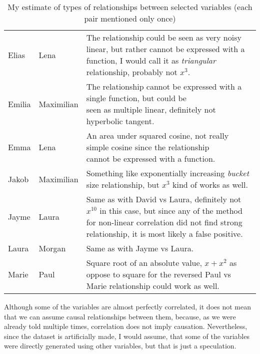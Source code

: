 \documentclass[a4paper,10pt]{article}\setlength{\textheight}{10in}\setlength{\textwidth}{6.5in}\setlength{\topmargin}{-0.125in}\setlength{\oddsidemargin}{-.2in}\setlength{\evensidemargin}{-.2in}\setlength{\headsep}{0.2in}\setlength{\footskip}{0pt}\usepackage{amsmath}\usepackage{fancyhdr}\usepackage{enumitem}\usepackage{hyperref}\usepackage{xcolor}\usepackage{graphicx}\pagestyle{fancy}
\begin{document}
\begin{enumerate}[topsep=0mm, partopsep=0mm, leftmargin=*]
\begin{table}[ht!]
\begin{tabular}{|l|l|l|}
     Elias &  Lena & \makecell{The relationship could be seen as very noisy linear, but rather cannot be\\expressed with a function, I would call it as \textit{triangular} relationship,\\probably not $x^3$.} \\[0.25cm]
     Emilia & Maximilian & \makecell{The relationship cannot be expressed with a single function, but could be\\seen as multiple linear, definitely not hyperbolic tangent.}\\[0.25cm]
     Emma &       Lena & \makecell{An area under squared cosine, not really simple cosine since the relationship\\cannot be expressed with a function.} \\[0.25cm]
     Jakob & Maximilian & \makecell{Something like exponentially increasing \textit{bucket} size relationship, but $x^3$ kind\\of works as well.} \\[0.25cm]
     Jayme &      Laura & \makecell{Same as with David vs Laura, definitely not $x^{10}$ in this case, but since any\\of the method for non-linear correlation did not find strong relationship, it\\is most likely a false positive.} \\[0.25cm] 
     Laura & Morgan & Same as with Jayme vs Laura. \\[0.25cm]
     Marie &       Paul & \makecell{Square root of an absolute value, $x+x^2$ as oppose to square for the reversed\\Paul vs Marie relationship could work as well.} \\[0.25cm]
\hline
\end{tabular}
\caption{My estimate of types of relationships between selected variables (each pair mentioned only once)}
\label{tab:my_estimate}
\end{table}

Although some of the variables are almost perfectly correlated, it does not mean that we can assume causal relationships between them, because, as we were already told multiple times, correlation does not imply causation. Nevertheless, since the dataset is artificially made, I would assume, that some of the variables were directly generated using other variables, but that is just a speculation.


\end{enumerate}
\end{document}
